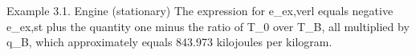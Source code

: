 Example 3.1. Engine (stationary)
The expression for e_ex,verl equals negative e_ex,st plus the quantity one minus the ratio of T_0 over T_B, all multiplied by q_B, which approximately equals 843.973 kilojoules per kilogram.